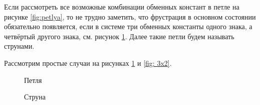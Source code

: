 \documentclass[utf8, babel, sor, jor, amsmath, amssymb, reprint]{elsarticle} %
\begin{document}
Если рассмотреть все возможные комбинации обменных констант в петле на рисунке \ref{fig:petlya}, то не трудно заметить, что фрустрация в основном состоянии обязательно появляется, если в системе три обменных константы одного знака, а четвёртый другого знака, см. рисунок \ref{fig:struna}. Далее такие петли будем называть струнами.

Рассмотрим простые случаи на рисунках  \ref{fig:struna} и \ref{fig: 3x2}.

\begin{figure}[h]
	\centering
	\begin{minipage}{0.3\textwidth}
		\centering
		\caption{Петля}
		\label{fig:petlya}
	\end{minipage}
	\begin{minipage}{0.3\textwidth}
		\centering
		\caption{Струна}
		\label{fig:struna}
	\end{minipage}
	\begin{minipage}{0.3\textwidth}

\end{minipage}
\end{figure}
\end{document}
